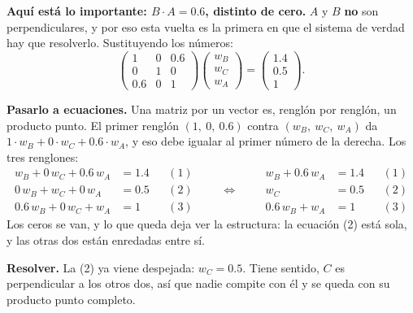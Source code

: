 \documentclass[11pt,letterpaper]{article}
\begin{document}
\textbf{Aquí está lo importante: $B \cdot A = 0.6$, distinto de
cero.} $A$ y $B$ \textbf{no} son perpendiculares, y por eso esta
vuelta es la primera en que el sistema de verdad hay que resolverlo.
Sustituyendo los números:
\[
    \begin{pmatrix}
        1   & 0 & 0.6 \\
        0   & 1 & 0   \\
        0.6 & 0 & 1
    \end{pmatrix}
    \begin{pmatrix} w_B \\ w_C \\ w_A \end{pmatrix}
    =
    \begin{pmatrix} 1.4 \\ 0.5 \\ 1 \end{pmatrix} .
\]

\textbf{Pasarlo a ecuaciones.} Una matriz por un vector es, renglón
por renglón, un producto punto. El primer renglón $(1,\ 0,\ 0.6)$
contra $(w_B,\ w_C,\ w_A)$ da
$1 \cdot w_B + 0 \cdot w_C + 0.6 \cdot w_A$, y eso debe igualar al
primer número de la derecha. Los tres renglones:
\[
    \begin{aligned}
        w_B + 0\,w_C + 0.6\, w_A &= 1.4 && (1) \\
        0\,w_B + w_C + 0\,w_A    &= 0.5 && (2) \\
        0.6\, w_B + 0\,w_C + w_A &= 1   && (3)
    \end{aligned}
    \qquad\Longleftrightarrow\qquad
    \begin{aligned}
        w_B + 0.6\, w_A &= 1.4 && (1) \\
        w_C &= 0.5 && (2) \\
        0.6\, w_B + w_A &= 1 && (3)
    \end{aligned}
\]
Los ceros se van, y lo que queda deja ver la estructura: la ecuación
(2) está sola, y las otras dos están enredadas entre sí.

\textbf{Resolver.} La (2) ya viene despejada: $w_C = 0.5$. Tiene
sentido, $C$ es perpendicular a los otros dos, así que nadie compite
con él y se queda con su producto punto completo.
\end{document}
